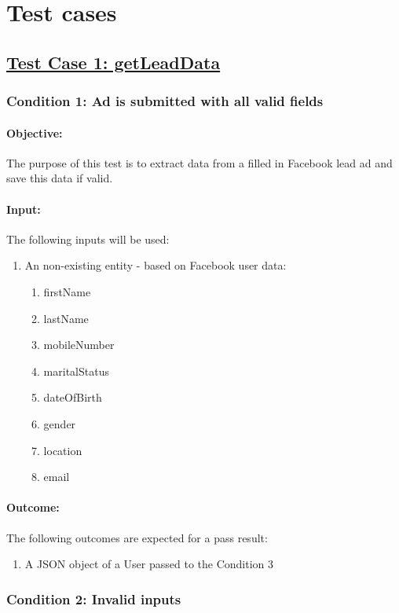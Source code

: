 \documentclass{article}
\begin{document}
\section{Test cases}\label{sec:testCases}
\subsection{\underline{Test Case 1: getLeadData}}\label{test1}
\subsubsection{Condition 1: Ad is submitted with all valid fields }
\paragraph{Objective:} The purpose of this test is to extract data from a filled in Facebook lead ad and save this data if valid.
\paragraph{Input:} The following inputs will be used:
\begin{enumerate}
	\item An non-existing entity - based on Facebook user data:
	\begin{enumerate}
		\item firstName
  		\item lastName
  		\item mobileNumber 
  		\item maritalStatus 
  		\item dateOfBirth 
 		\item gender
  		\item location 
 		\item email	
	\end{enumerate}
\end{enumerate}
\paragraph{Outcome:} The following outcomes are expected for a pass result:
\begin{enumerate}
	\item A JSON object of a User passed to the Condition 3
\end{enumerate}
\subsubsection{Condition 2: Invalid inputs}
\end{document}

